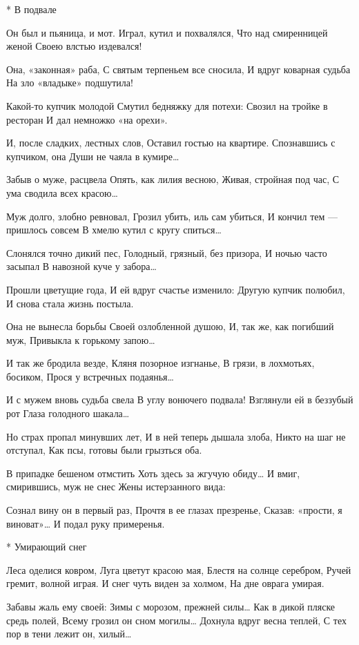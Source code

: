 * В подвале

Он был и пьяница, и мот.
Играл, кутил и похвалялся,
Что над смиренницей женой
Своею влстью издевался!

Она, «законная» раба,
С святым терпеньем все сносила,
И вдруг коварная судьба
На зло «владыке» подшутила!

Какой-то купчик молодой
Смутил бедняжку для потехи:
Свозил на тройке в ресторан
И дал немножко «на орехи».

И, после сладких, лестных слов,
Оставил гостью на квартире.
Спознавшись с купчиком, она
Души не чаяла в кумире…

Забыв о муже, расцвела
Опять, как лилия весною,
Живая, стройная под час,
С ума сводила всех красою…

Муж долго, злобно ревновал,
Грозил убить, иль сам убиться,
И кончил тем — пришлось совсем
В хмелю кутил с кругу спиться…

Слонялся точно дикий пес,
Голодный, грязный, без призора,
И ночью часто засыпал
В навозной куче у забора…

Прошли цветущие года,
И ей вдруг счастье изменило:
Другую купчик полюбил,
И снова стала жизнь постыла.

Она не вынесла борьбы
Своей озлобленной душою,
И, так же, как погибший муж,
Привыкла к горькому запою…

И так же бродила везде,
Кляня позорное изгнанье,
В грязи, в лохмотьях, босиком,
Прося у встречных подаянья…

И с мужем вновь судьба свела
В углу вонючего подвала!
Взглянули ей в беззубый рот
Глаза голодного шакала…

Но страх пропал минувших лет,
И в ней теперь дышала злоба,
Никто на шаг не отступал,
Как псы, готовы были грызться оба.

В припадке бешеном отмстить
Хоть здесь за жгучую обиду…
И вмиг, смирившись, муж не снес
Жены истерзанного вида:

Сознал вину он в первый раз,
Прочтя в ее глазах презренье,
Сказав: «прости, я виноват»…
И подал руку примеренья.


* Умирающий снег

Леса оделися ковром,
Луга цветут красою мая,
Блестя на солнце серебром,
Ручей гремит, волной играя.
И снег чуть виден за холмом,
На дне оврага умирая.

Забавы жаль ему своей:
Зимы с морозом, прежней силы…
Как в дикой пляске средь полей,
Всему грозил он сном могилы…
Дохнула вдруг весна теплей,
С тех пор в тени лежит он, хилый…

